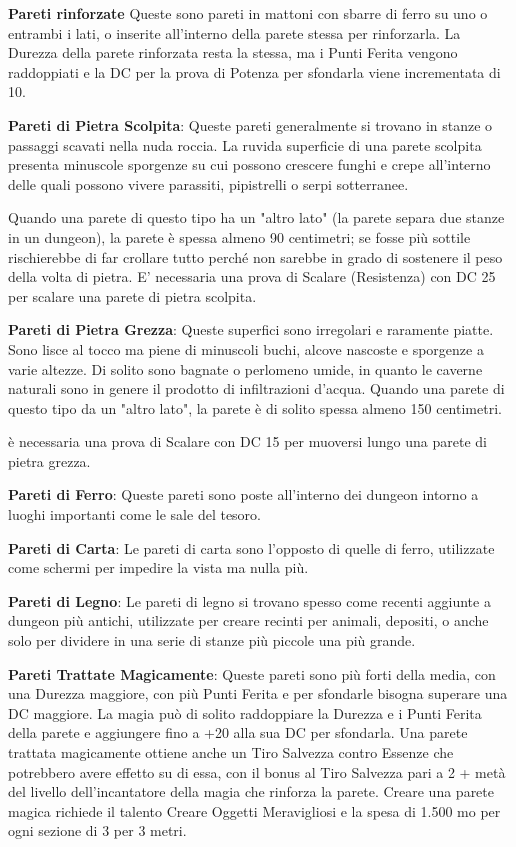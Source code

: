 \documentclass[a4paper,11pt,twoside,openany]{book}
\begin{document}
\textbf{Pareti rinforzate} Queste sono pareti in mattoni con sbarre di ferro su uno o entrambi i lati, o inserite all’interno della parete stessa per rinforzarla. La Durezza della parete rinforzata resta la stessa, ma i Punti Ferita vengono raddoppiati e la DC per la prova di Potenza per sfondarla viene incrementata di 10.

\textbf{Pareti di Pietra Scolpita}: Queste pareti generalmente si trovano in stanze o passaggi scavati nella nuda roccia. La ruvida superficie di una parete scolpita presenta minuscole sporgenze su cui possono crescere funghi e crepe all'interno delle quali possono vivere parassiti, pipistrelli o serpi sotterranee.

Quando una parete di questo tipo ha un "altro lato" (la parete separa due stanze in un dungeon), la parete è spessa almeno 90 centimetri; se fosse più sottile rischierebbe di far crollare tutto perché non sarebbe in grado di sostenere il peso della volta di pietra. E' necessaria una prova di Scalare (Resistenza) con DC 25 per scalare una parete di pietra scolpita.

\textbf{Pareti di Pietra Grezza}: Queste superfici sono irregolari e raramente piatte. Sono lisce al tocco ma piene di minuscoli buchi, alcove nascoste e sporgenze a varie altezze. Di solito sono bagnate o perlomeno umide, in quanto le caverne naturali sono in genere il prodotto di infiltrazioni d'acqua. Quando una parete di questo tipo da un "altro lato", la parete è di solito spessa almeno 150 centimetri.

è necessaria una prova di Scalare con DC 15 per muoversi lungo una parete di pietra grezza.

\textbf{Pareti di Ferro}: Queste pareti sono poste all'interno dei dungeon intorno a luoghi importanti come le sale del tesoro.

\textbf{Pareti di Carta}: Le pareti di carta sono l'opposto di quelle di ferro, utilizzate come schermi per impedire la vista ma nulla più.

\textbf{Pareti di Legno}: Le pareti di legno si trovano spesso come recenti aggiunte a dungeon più antichi, utilizzate per creare recinti per animali, depositi, o anche solo per dividere in una serie di stanze più piccole una più grande.

\textbf{Pareti Trattate Magicamente}: Queste pareti sono più forti della media, con una Durezza maggiore, con più Punti Ferita e per sfondarle bisogna superare una DC maggiore. La magia può di solito raddoppiare la Durezza e i Punti Ferita della parete e aggiungere fino a +20 alla sua DC per sfondarla. Una parete trattata magicamente ottiene anche un Tiro Salvezza contro Essenze che potrebbero avere effetto su di essa, con il bonus al Tiro Salvezza pari a 2 + metà del livello dell'incantatore della magia che rinforza la parete. Creare una parete magica richiede il talento Creare Oggetti Meravigliosi e la spesa di 1.500 mo per ogni sezione di 3 per 3 metri.
\end{document}

